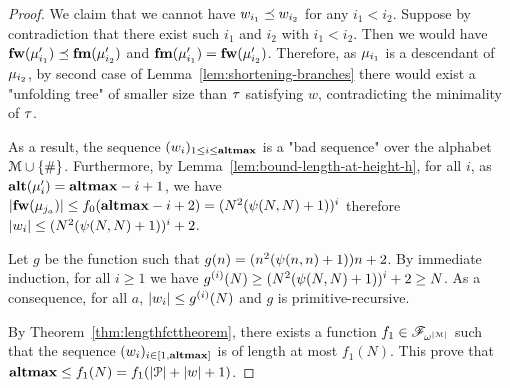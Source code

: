 \begin{proof}
	We claim that we cannot have $w_{i_1}\preceq w_{i_2}$ for any  $i_1< i_2$.
	Suppose by contradiction that there exist such $i_1$ and $i_2$ with $i_1 < i_2$. Then we would have $\mathbf{fw}(\mu'_{i_1}) \preceq \mathbf{fm}(\mu'_{i_2})$ and $\mathbf{fm}(\mu'_{i_1}) = \mathbf{fw}(\mu'_{i_2})$.
	Therefore, as $\mu_{i_1}$ is a descendant of $\mu_{i_2}$, by second case of Lemma~\ref{lem:shortening-branches} there would exist a "unfolding tree" of smaller size than $\tau$ satisfying $w$, contradicting the minimality of $\tau$.
	
	As a result, the sequence $(w_i)_{1\leq i \leq \mathbf{altmax}}$ is a "bad sequence" over the alphabet $\mathcal{M}\cup\{\#\}$.
	Furthermore, by Lemma~\ref{lem:bound-length-at-height-h}, for all $i$, as $\mathbf{alt}(\mu'_{i}) = \mathbf{altmax}-i+1$, we have $|\mathbf{fw}(\mu_{j_a})| \leq f_0(\mathbf{altmax}-i+2) = (N^2(\psi(N,N)+1))^{i}$ therefore $|w_i| \leq (N^2(\psi(N,N)+1))^{i}+2$.
	
	Let $g$ be the function such that $g(n) = (n^2(\psi(n,n)+1)) n +2$. By immediate induction, for all $i\geq 1$ we have $g^{(i)}(N) \geq (N^2(\psi(N,N)+1))^{i} +2 \geq N$. As a consequence, for all $a$, $|w_i| \leq g^{(i)}(N)$ and $g$ is primitive-recursive.
	
	By Theorem~\ref{thm:lengthfcttheorem}, there exists a function $f_1 \in \mathscr{F}_{\omega^{|\mathcal{M}|}}$ such that the sequence $(w_i)_{i \in [1,\mathbf{altmax}]}$ is of length at most $f_1(N)$. This prove that $\mathbf{altmax} \leq f_1(N) = f_1(|\mathcal{P}| + |w| + 1)$.
\end{proof}

\lemBoundMinHeight*

